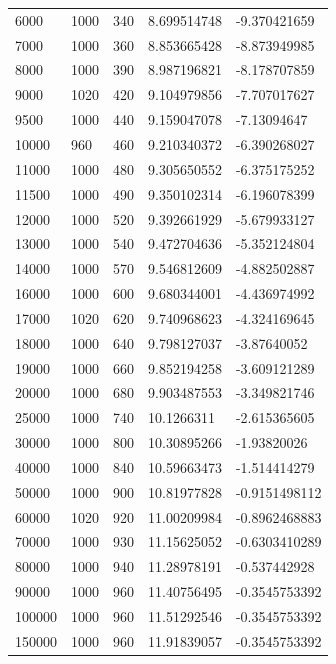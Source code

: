 \documentclass[twocolumn, 10pt,a4j]{jsarticle}
\begin{document}
\begin{table}[t]
\begin{tabular}{lllll}
                  6000& 1000& 340& 8.699514748& -9.370421659 \\
                  7000& 1000& 360& 8.853665428& -8.873949985 \\
                  8000& 1000& 390& 8.987196821& -8.178707859 \\
                  9000& 1020& 420& 9.104979856& -7.707017627 \\
                  9500& 1000& 440& 9.159047078& -7.13094647 \\
                  10000& 960& 460& 9.210340372& -6.390268027 \\
                  11000& 1000& 480& 9.305650552& -6.375175252 \\
                  11500& 1000& 490& 9.350102314& -6.196078399 \\
                  12000& 1000& 520& 9.392661929& -5.679933127 \\
                  13000& 1000& 540& 9.472704636& -5.352124804 \\
                  14000& 1000& 570& 9.546812609& -4.882502887 \\
                  16000& 1000& 600& 9.680344001& -4.436974992 \\
                  17000& 1020& 620& 9.740968623& -4.324169645 \\
                  18000& 1000& 640& 9.798127037& -3.87640052 \\
                  19000& 1000& 660& 9.852194258& -3.609121289 \\
                  20000& 1000& 680& 9.903487553& -3.349821746 \\
                  25000& 1000& 740& 10.1266311& -2.615365605 \\
                  30000& 1000& 800& 10.30895266& -1.93820026 \\
                  40000& 1000& 840& 10.59663473& -1.514414279 \\
                  50000& 1000& 900& 10.81977828& -0.9151498112 \\
                  60000& 1020& 920& 11.00209984& -0.8962468883 \\
                  70000& 1000& 930& 11.15625052& -0.6303410289 \\
                  80000& 1000& 940& 11.28978191& -0.537442928 \\
                  90000& 1000& 960& 11.40756495& -0.3545753392 \\
                  100000& 1000& 960& 11.51292546& -0.3545753392 \\
                  150000& 1000& 960& 11.91839057& -0.3545753392 \\ \hline

            \end{tabular}
          \end{table}
\end{document}
